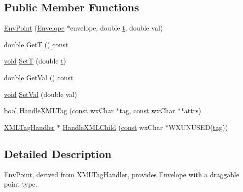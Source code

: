 \subsection*{Public Member Functions}
\begin{DoxyCompactItemize}
\item 
\hyperlink{class_env_point_acbbdb26d5b667bb2a0bb1d42159260eb}{Env\+Point} (\hyperlink{class_envelope}{Envelope} $\ast$envelope, double \hyperlink{octave__test_8m_aaccc9105df5383111407fd5b41255e23}{t}, double val)
\item 
double \hyperlink{class_env_point_a7a45982a42a319d7a2ebd93caf2d37b2}{GetT} () \hyperlink{getopt1_8c_a2c212835823e3c54a8ab6d95c652660e}{const} 
\item 
\hyperlink{sound_8c_ae35f5844602719cf66324f4de2a658b3}{void} \hyperlink{class_env_point_abb2a889ec1dfc887081cbd956d330307}{SetT} (double \hyperlink{octave__test_8m_aaccc9105df5383111407fd5b41255e23}{t})
\item 
double \hyperlink{class_env_point_a17919888a1b25ab0c6b2f30541645ec2}{Get\+Val} () \hyperlink{getopt1_8c_a2c212835823e3c54a8ab6d95c652660e}{const} 
\item 
\hyperlink{sound_8c_ae35f5844602719cf66324f4de2a658b3}{void} \hyperlink{class_env_point_a24be12a7de872660810026e2b277cbcd}{Set\+Val} (double val)
\item 
\hyperlink{mac_2config_2i386_2lib-src_2libsoxr_2soxr-config_8h_abb452686968e48b67397da5f97445f5b}{bool} \hyperlink{class_env_point_adae6f328eff8b89fc026eb502131eb56}{Handle\+X\+M\+L\+Tag} (\hyperlink{getopt1_8c_a2c212835823e3c54a8ab6d95c652660e}{const} wx\+Char $\ast$\hyperlink{structtag}{tag}, \hyperlink{getopt1_8c_a2c212835823e3c54a8ab6d95c652660e}{const} wx\+Char $\ast$$\ast$attrs)
\item 
\hyperlink{class_x_m_l_tag_handler}{X\+M\+L\+Tag\+Handler} $\ast$ \hyperlink{class_env_point_a0ca149271d107560858dd8edc899746d}{Handle\+X\+M\+L\+Child} (\hyperlink{getopt1_8c_a2c212835823e3c54a8ab6d95c652660e}{const} wx\+Char $\ast$W\+X\+U\+N\+U\+S\+ED(\hyperlink{structtag}{tag}))
\end{DoxyCompactItemize}


\subsection{Detailed Description}
\hyperlink{class_env_point}{Env\+Point}, derived from \hyperlink{class_x_m_l_tag_handler}{X\+M\+L\+Tag\+Handler}, provides \hyperlink{class_envelope}{Envelope} with a draggable point type. 

